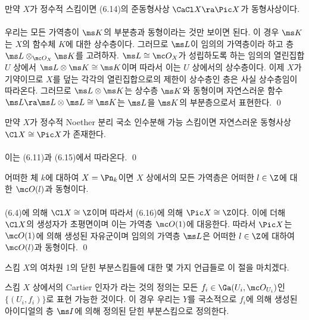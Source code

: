 	
	\begin{proposition}
	만약 $X$가 정수적 스킴이면 (6.14)의 준동형사상 $\CaCl X\ra\Pic X$가 동형사상이다.\\\\
	\pf 우리는 모든 가역층이 $\ms K$의 부분층과 동형이라는 것만 보이면 된다.
	이 경우 $\ms K$는 $X$의 함수체 $K$에 대한 상수층이다.
	그러므로 $\ms L$이 임의의 가역층이라 하고 층 $\ms L\otimes_{\mc O_X}\ms K$를 고려하자.
	$\ms L\cong\mc O_X$가 성립하도록 하는 임의의 열린집합 $U$ 상에서 $\ms L\otimes\ms K\cong\ms K$이며
	따라서 이는 $U$ 상에서의 상수층이다.
	이제 $X$가 기약이므로 $X$를 덮는 각각의 열린집합으로의 제한이 상수층인 층은 사실 상수층임이 따라온다.
	그러므로 $\ms L\otimes\ms K$는 상수층 $\ms K$와 동형이며
	자연스러운 함수 $\ms L\ra\ms L\otimes\ms L\cong\ms K$는 $\ms L$을 $\ms K$의 부분층으로서 표현한다.
	\qed
	\end{proposition}
	
	
	\begin{corollary}
	만약 $X$가 정수적 Noether 분리 국소 인수분해 가능 스킴이면 자연스러운 동형사상 $\Cl X\cong\Pic X$가 존재한다.\\\\
	\pf 이는 (6.11)과 (6.15)에서 따라온다.
	\qed
	\end{corollary}
	
	
	\begin{corollary}
	어떠한 체 $k$에 대하여 $X=\Pn_k$이면 $X$ 상에서의 모든 가역층은 어떠한 $l\in\Z$에 대한 $\mc O(l)$과 동형이다.\\\\
	\pf (6.4)에 의해 $\Cl X\cong\Z$이며 따라서 (6.16)에 의해 $\Pic X\cong\Z$이다.
	이에 더해 $\Cl X$의 생성자가 초평면이며 이는 가역층 $\mc O(1)$에 대응한다.
	따라서 $\Pic X$는 $\mc O(1)$에 의해 생성된 자유군이며 임의의 가역층 $\ms L$은 어떠한 $l\in\Z$에 대하여 $\mc O(l)$과 동형이다.
	\qed
	\end{corollary}
	
	스킴 $X$의 여차원 1의 닫힌 부분스킴들에 대한 몇 가지 언급들로 이 절을 마치겠다.
	
	
	\begin{definition}
	스킴 $X$ 상에서의 Cartier 인자가 라는 것의 정의는
	모든 $f_i\in\Ga(U_i,\mc O_{U_i})$인 $\{(U_i,f_i)\}$로 표현 가능한 것이다.
	이 경우 우리는  $Y$를
	국소적으로 $f_i$에 의해 생성된 아이디얼의 층 $\ms I$에 의해 정의된 닫힌 부분스킴으로 정의한다.
	\end{definition}
	
